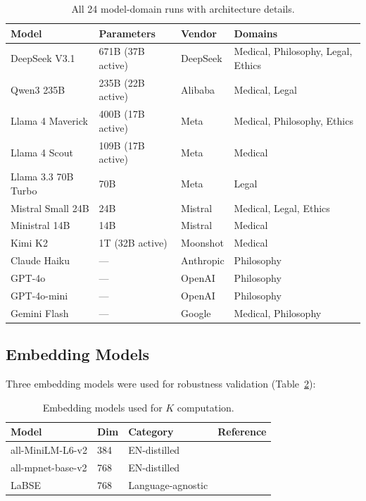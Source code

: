 \documentclass[11pt,a4paper]{article}
\begin{document}
\begin{table}[H]
\centering
\caption{All 24 model-domain runs with architecture details.}
\label{tab:models_full}
\begin{tabular}{llll}
\toprule
\textbf{Model} & \textbf{Parameters} & \textbf{Vendor} & \textbf{Domains} \\
\midrule
DeepSeek V3.1         & 671B (37B active)  & DeepSeek     & Medical, Philosophy, Legal, Ethics \\
Qwen3 235B            & 235B (22B active)  & Alibaba      & Medical, Legal \\
Llama 4 Maverick      & 400B (17B active)  & Meta         & Medical, Philosophy, Ethics \\
Llama 4 Scout         & 109B (17B active)  & Meta         & Medical \\
Llama 3.3 70B Turbo   & 70B               & Meta         & Legal \\
Mistral Small 24B     & 24B               & Mistral      & Medical, Legal, Ethics \\
Ministral 14B         & 14B               & Mistral      & Medical \\
Kimi K2               & 1T (32B active)    & Moonshot     & Medical \\
Claude Haiku          & ---               & Anthropic    & Philosophy \\
GPT-4o                & ---               & OpenAI       & Philosophy \\
GPT-4o-mini           & ---               & OpenAI       & Philosophy \\
Gemini Flash          & ---               & Google       & Medical, Philosophy \\
\bottomrule
\end{tabular}
\end{table}

\subsection{Embedding Models}

Three embedding models were used for robustness validation (Table~\ref{tab:embeddings}):

\begin{table}[H]
\centering
\caption{Embedding models used for $K$ computation.}
\label{tab:embeddings}
\begin{tabular}{llll}
\toprule
\textbf{Model} & \textbf{Dim} & \textbf{Category} & \textbf{Reference} \\
\midrule
all-MiniLM-L6-v2  & 384 & EN-distilled      & \citet{reimers2020} \\
all-mpnet-base-v2 & 768 & EN-distilled      & \citet{reimers2020} \\
LaBSE             & 768 & Language-agnostic & \citet{feng2022} \\
\bottomrule
\end{tabular}
\end{table}
\end{document}
